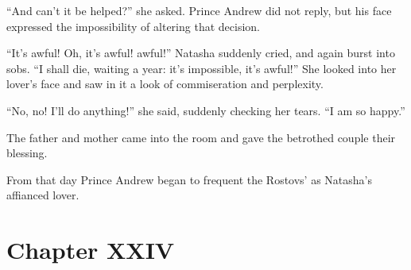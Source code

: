 ``And can't it be helped?'' she asked. Prince Andrew did not
reply, but his face expressed the impossibility of altering that
decision.

``It's awful! Oh, it's awful! awful!'' Natasha suddenly cried,
and again burst into sobs. ``I shall die, waiting a year: it's
impossible, it's awful!'' She looked into her lover's face and
saw in it a look of commiseration and perplexity.

``No, no! I'll do anything!'' she said, suddenly checking her
tears. ``I am so happy.''

The father and mother came into the room and gave the betrothed
couple their blessing.

From that day Prince Andrew began to frequent the Rostovs' as
Natasha's affianced lover.


\chapter*{Chapter XXIV}
\ifaudio
{} 
\fi


